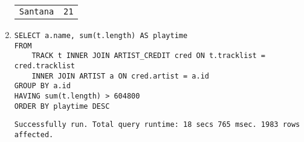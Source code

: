 \documentclass{article}
\begin{document}
\begin{enumerate}
\begin{tabular}{|c|c|}
                \texttt{Santana} &   \texttt{21} \\
            \end{tabular}
            \item
                \begin{verbatim}
SELECT a.name, sum(t.length) AS playtime
FROM
    TRACK t INNER JOIN ARTIST_CREDIT cred ON t.tracklist = cred.tracklist
    INNER JOIN ARTIST a ON cred.artist = a.id
GROUP BY a.id
HAVING sum(t.length) > 604800
ORDER BY playtime DESC
                \end{verbatim}
                \texttt{Successfully run. Total query runtime: 18 secs 765 msec. 1983 rows affected.}
        \end{enumerate}
\end{document}
